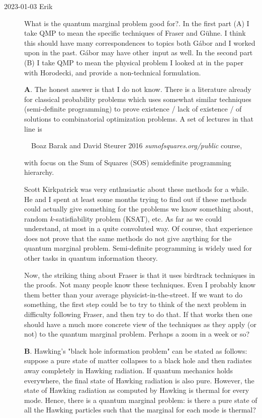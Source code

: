 \begin{description}
\item[2023-01-03 Erik]
What is the quantum marginal problem good for?. In the first part (A) I take
QMP to mean the specific techniques of Fraser and G\"{u}hne. I think this
should have many correspondences to topics both G{\'a}bor and I worked upon
in the past. G{\'a}bor may have other input as well. In the second part (B) I
take QMP to mean the physical problem I looked at in the paper with
Horodecki, and provide a non-technical formulation.

\medskip

\textbf{A}. The honest answer is that I do not know. There is a literature already for
classical probability problems which uses somewhat similar techniques
(semi-definite programming) to prove existence / lack of existence / of
solutions to combinatorial optimization problems. A set of lectures in that line
is

  Boaz Barak and David Steurer 2016 %
  {{\em sumofsquares.org/public}} course, 

with focus on the Sum of Squares (SOS) semidefinite programming hierarchy.

Scott Kirkpatrick was very enthusiastic about these methods for a while. He
and I spent at least some months trying to find out if these methods could
actually give something for the problems we know something about, random
$k$-satisfiability problem (KSAT),
etc. As far as we could understand, at most in a quite convoluted way. Of
course, that experience does not prove that the same methods do not give
anything for the quantum marginal problem. Semi-definite programming is
widely used for other tasks in quantum information theory.

Now, the striking thing about Fraser is that it uses birdtrack
techniques in the proofs. Not many people know these techniques. Even I
probably know them better than your average physicist-in-the-street. If we
want to do something, the first step could be to try to think of the next
problem in difficulty following Fraser, and then try to do that. If that
works then one should have a much more concrete view of the techniques as
they apply (or not) to the quantum marginal problem. Perhaps a zoom in a week
or so? 

\medskip

\textbf{B}. Hawking's "black hole information problem" can be stated as follows:
suppose a pure state of matter collapses to a black hole and then radiates
away completely in Hawking radiation. If quantum mechanics holds everywhere,
the final state of Hawking radiation is also pure. However, the state of
Hawking radiation as computed by Hawking is thermal for every mode. Hence,
there is a quantum marginal problem: is there a pure state of all the Hawking
particles such that the marginal for each mode is thermal?


\end{description}
